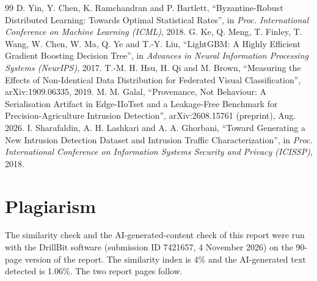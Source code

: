 \documentclass[12pt,a4paper]{report}
\begin{document}
\begin{thebibliography}{99}
 D. Yin, Y. Chen, K. Ramchandran and P. Bartlett, ``Byzantine-Robust Distributed Learning: Towards Optimal Statistical Rates'', in \textit{Proc. International Conference on Machine Learning (ICML)}, 2018.
 G. Ke, Q. Meng, T. Finley, T. Wang, W. Chen, W. Ma, Q. Ye and T.-Y. Liu, ``LightGBM: A Highly Efficient Gradient Boosting Decision Tree'', in \textit{Advances in Neural Information Processing Systems (NeurIPS)}, 2017.
 T.-M. H. Hsu, H. Qi and M. Brown, ``Measuring the Effects of Non-Identical Data Distribution for Federated Visual Classification'', arXiv:1909.06335, 2019.
 M. M. Galal, ``Provenance, Not Behaviour: A Serialisation Artifact in Edge-IIoTset and a Leakage-Free Benchmark for Precision-Agriculture Intrusion Detection'', arXiv:2608.15761 (preprint), Aug. 2026.
 I. Sharafaldin, A. H. Lashkari and A. A. Ghorbani, ``Toward Generating a New Intrusion Detection Dataset and Intrusion Traffic Characterization'', in \textit{Proc. International Conference on Information Systems Security and Privacy (ICISSP)}, 2018.
\end{thebibliography}
\clearpage
\chapter*{Plagiarism}
The similarity check and the AI-generated-content check of this report were run with the DrillBit software (submission ID 7421657, 4 November 2026) on the 90-page version of the report. The similarity index is 4\% and the AI-generated text detected is 1.06\%. The two report pages follow.
\clearpage



\appendix
\renewcommand{\thechapter}{\Alph{chapter}}
\renewcommand{\thesection}{\Roman{section}}
\end{document}
